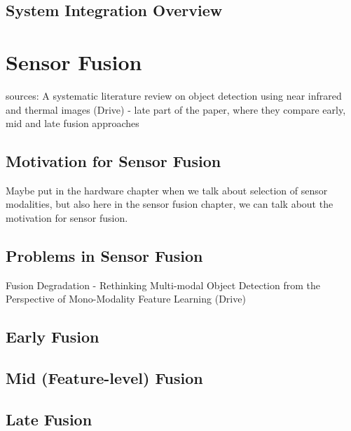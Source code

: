 \documentclass[12pt,oneside,bibtotoc,liststotoc]{scrbook}
\begin{document}
\section{System Integration Overview}





\newpage
\chapter{Sensor Fusion}
\label{chap:sensor_fusion}

sources: 
A systematic literature review on object detection using near infrared and
thermal images (Drive) - late part of the paper, where they compare early, mid and late fusion approaches


\section{Motivation for Sensor Fusion}

Maybe put in the hardware chapter when we talk about selection
of sensor modalities, but also here in the sensor fusion 
chapter, we can talk about the motivation for sensor fusion.

\section{Problems in Sensor Fusion}

Fusion Degradation - Rethinking Multi-modal Object Detection from the Perspective of
Mono-Modality Feature Learning (Drive)

\section{Early Fusion}

\section{Mid (Feature-level) Fusion}

\section{Late Fusion}
\end{document}
